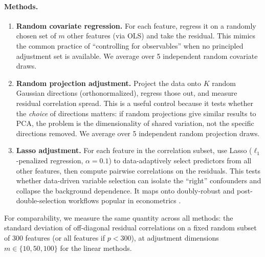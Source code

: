 \paragraph{Methods.}
\begin{enumerate}
\item \textbf{Random covariate regression.}
  For each feature, regress it on a randomly chosen set of $m$ other features
  (via OLS) and take the residual. This mimics the common practice of
  ``controlling for observables'' when no principled adjustment set is available.
  We average over 5 independent random covariate draws.

\item \textbf{Random projection adjustment.}
  Project the data onto $K$ random Gaussian directions (orthonormalized), regress
  those out, and measure residual correlation spread. This is a useful control
  because it tests whether the \emph{choice} of directions matters: if random
  projections give similar results to PCA, the problem is the dimensionality of
  shared variation, not the specific directions removed. We average over 5
  independent random projection draws.

\item \textbf{Lasso adjustment.}
  For each feature in the correlation subset, use Lasso ($\ell_1$-penalized
  regression, $\alpha = 0.1$) to data-adaptively select predictors from all other
  features, then compute pairwise correlations on the residuals. This tests
  whether data-driven variable selection can isolate the ``right'' confounders
  and collapse the background dependence. It maps onto doubly-robust and
  post-double-selection workflows popular in econometrics \citep{belloni2014}.
\end{enumerate}

For comparability, we measure the same quantity across all methods: the standard
deviation of off-diagonal residual correlations on a fixed random subset of
300 features (or all features if $p < 300$), at adjustment dimensions
$m \in \{10, 50, 100\}$ for the linear methods.

